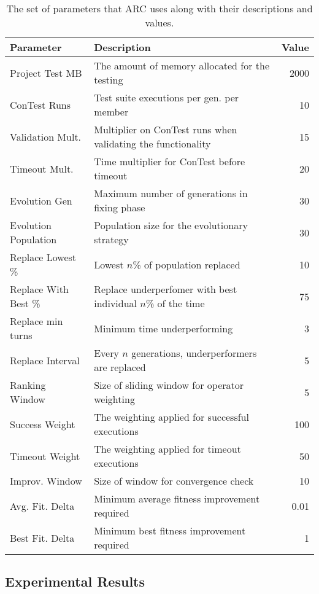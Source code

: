 \begin{table}[t!]
\caption{The set of parameters that ARC uses along with their descriptions and
 values.}
\begin{center}
\lstset{basicstyle=\scriptsize}
\begin{tabular}{|l|p{7.5cm}|r|}
\hline
\textbf{Parameter} & \textbf{Description} & \textbf{Value}\\
\hline
Project Test MB & The amount of memory allocated for the testing & 2000\\
\hline
ConTest Runs & Test suite executions per gen. per member & 10\\
\hline
Validation Mult. & Multiplier on ConTest runs when validating the functionality & 15\\
\hline
Timeout Mult. & Time multiplier for ConTest before timeout & 20\\
\hline
Evolution Gen & Maximum number of generations in fixing phase & 30\\
\hline
Evolution Population & Population size for the evolutionary strategy & 30\\
\hline
Replace Lowest \% & Lowest $n$\% of population replaced & 10\\
\hline
Replace With Best \% & Replace underperfomer with best individual $n$\% of the time & 75\\
\hline
Replace min turns & Minimum time underperforming & 3\\
\hline
Replace Interval & Every $n$ generations, underperformers are replaced & 5\\
\hline
Ranking Window & Size of sliding window for operator weighting & 5\\
\hline
Success Weight & The weighting applied for successful executions & 100\\
\hline
Timeout Weight & The weighting applied for timeout executions & 50\\
\hline
Improv. Window & Size of window for convergence check & 10\\
\hline
Avg. Fit. Delta & Minimum average fitness improvement required & 0.01\\
\hline
Best Fit. Delta & Minimum best fitness improvement required & 1\\
\hline
\end{tabular}
\label{tbl:used_parameters}
\end{center}
\end{table}

\subsection{Experimental Results}
\label{sec:experimental_results}

